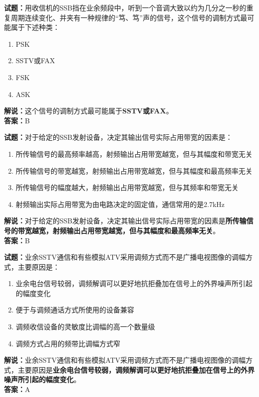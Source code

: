 \documentclass{ctexbook}
\begin{document}
\bigskip


\noindent\textbf{试题：}用收信机的SSB挡在业余频段中，听到一个音调大致以约为几分之一秒的重复周期连续变化、并夹有一种规律的“笃、笃”声的信号，这个信号的调制方式最可能属于下述种类：
\begin{enumerate}[leftmargin=3em]
\item PSK
\item SSTV或FAX
\item FSK
\item ASK
\end{enumerate}
\noindent\textbf{解说：}这个信号的调制方式最可能属于\textbf{SSTV或FAX}。\\\noindent\textbf{答案：}B



\bigskip


\noindent\textbf{试题：}对于给定的SSB发射设备，决定其输出信号实际占用带宽的因素是：
\begin{enumerate}[leftmargin=3em]
\item 所传输信号的最高频率越高，射频输出占用带宽越宽，但与其幅度和带宽无关
\item 所传输信号的带宽越宽，射频输出占用带宽越宽，但与其幅度和最高频率无关
\item 所传输信号的幅度越大，射频输出占用带宽越宽，但与其频率和带宽无关
\item 射频输出实际占用带宽为由电路决定的固定值，通信常用的是2.7\unit{\kHz}
\end{enumerate}
\noindent\textbf{解说：}对于给定的SSB发射设备，决定其输出信号实际占用带宽的因素是\textbf{所传输信号的带宽越宽，射频输出占用带宽越宽，但与其幅度和最高频率无关}。\\\noindent\textbf{答案：}B




\bigskip


\noindent\textbf{试题：}业余SSTV通信和有些模拟ATV采用调频方式而不是广播电视图像的调幅方式，主要原因是：
\begin{enumerate}[leftmargin=3em]
\item 业余电台信号较弱，调频解调可以更好地抗拒叠加在信号上的外界噪声所引起的幅度变化
\item 便于与调频通话方式所使用的设备兼容
\item 调频收信设备的灵敏度比调幅的高一个数量级
\item 调频方式占用的频带比调幅方式窄
\end{enumerate}
\noindent\textbf{解说：}业余SSTV通信和有些模拟ATV采用调频方式而不是广播电视图像的调幅方式，主要原因是\textbf{业余电台信号较弱，调频解调可以更好地抗拒叠加在信号上的外界噪声所引起的幅度变化}。\\\noindent\textbf{答案：}A
\end{document}
